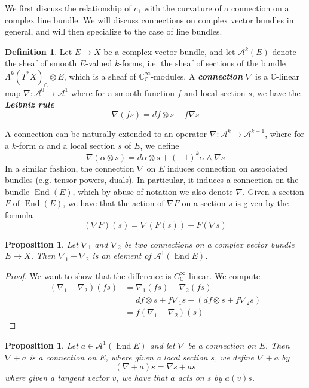 \documentclass[psamsfonts, 12pt]{amsart}
\newtheorem{prop}[thm]{Proposition}
\theoremstyle{definition}
\newtheorem{defn}[thm]{Definition}
\theoremstyle{remark}
\newcommand{\ib}[1]{\textbf{\textit{#1}}}
\newcommand{\C}{\mathbb{C}}
\DeclareMathOperator{\End}{End}
\begin{document}
We first discuss the relationship of $c_1$ with the curvature of a connection on
a complex line bundle. We will discuss connections on complex vector bundles in
general, and will then specialize to the case of line bundles.
%
\begin{defn}
Let $E \to X$ be a complex vector bundle, and let $\mathcal{A}^k(E)$ denote the
sheaf of smooth $E$-valued $k$-forms, i.e. the sheaf of sections of the bundle
$\Lambda^k(T^*X)_\C \otimes E$, which is a sheaf of $\C^\infty_\C$-modules. A
\ib{connection} $\nabla$ is a $\C$-linear map
$\nabla : \mathcal{A}^0 \to \mathcal{A}^1$
where for a smooth function $f$ and local section $s$, we have the \ib{Leibniz rule}
\[
\nabla(fs) = df \otimes s + f\nabla s
\]
\end{defn}
%
A connection can be naturally extended to an operator
$\nabla : \mathcal{A}^k \to \mathcal{A}^{k+1}$, where for a $k$-form $\alpha$
and a local section $s$ of $E$, we define
\[
\nabla(\alpha \otimes s) = d\alpha \otimes s + (-1)^k \alpha \wedge \nabla s
\]
In a similar fashion, the connection $\nabla$ on $E$ induces connection on associated
bundles (e.g. tensor powers, duals). In particular, it induces a connection on the bundle
$\End(E)$, which by abuse of notation we also denote $\nabla$. Given a section $F$ of
$\End(E)$, we have that the action of $\nabla F$ on a section $s$ is given by the formula
\[
(\nabla F)(s) = \nabla(F(s)) - F(\nabla s)
\]
\begin{prop}
Let $\nabla_1$ and $\nabla_2$ be two connections on a complex vector bundle
$E \to X$. Then $\nabla_1 - \nabla_2$ is an element of $\mathcal{A}^1(\End E)$.
\end{prop}
%
\begin{proof}
We want to show that the difference is $C^\infty_\C$-linear. We compute
\begin{align*}
(\nabla_1 - \nabla_2)(fs) &= \nabla_1(fs) - \nabla_2(fs) \\
&= df \otimes s + f\nabla_1s - (df \otimes s + f\nabla_2s) \\
&= f(\nabla_1 - \nabla_2)(s)
\end{align*}
\end{proof}
%
\begin{prop}
Let $a \in \mathcal{A}^1(\End E)$ and let $\nabla$ be a connection on $E$. Then
$\nabla + a$ is a connection on $E$, where given a local
section $s$, we define $\nabla + a$ by
\[
(\nabla + a)s = \nabla s + as
\]
where given a tangent vector $v$, we have that $a$ acts on $s$ by $a(v)s$.
\end{prop}
\end{document}

